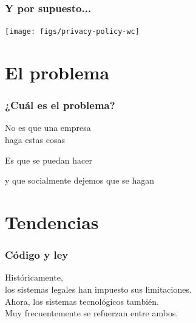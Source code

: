 \documentclass[17pt,aspectratio=169]{beamer}
\begin{document}

\begin{frame}
\frametitle{Y por supuesto...}

\begin{center}
\texttt{[image: figs/privacy-policy-wc]}
\end{center}

\end{frame}

\section{El problema}


\begin{frame}
\frametitle{¿Cuál es el problema?}

{\large
\begin{center}
No es que una empresa \\
haga estas cosas
\pause
\vspace{1cm}

Es que se puedan hacer
\pause
\vspace{1cm}

y que socialmente dejemos que se hagan
\end{center}
}
\end{frame}



\section{Tendencias}


\begin{frame}
\frametitle{Código y ley}

\begin{center}
  Históricamente, \\
  los sistemas legales han impuesto sus limitaciones. \\
  \vspace{1cm}
Ahora, los sistemas tecnológicos también. \\
  \vspace{1cm}
Muy frecuentemente se refuerzan entre ambos. \\
\end{center}

\end{frame}
\end{document}
